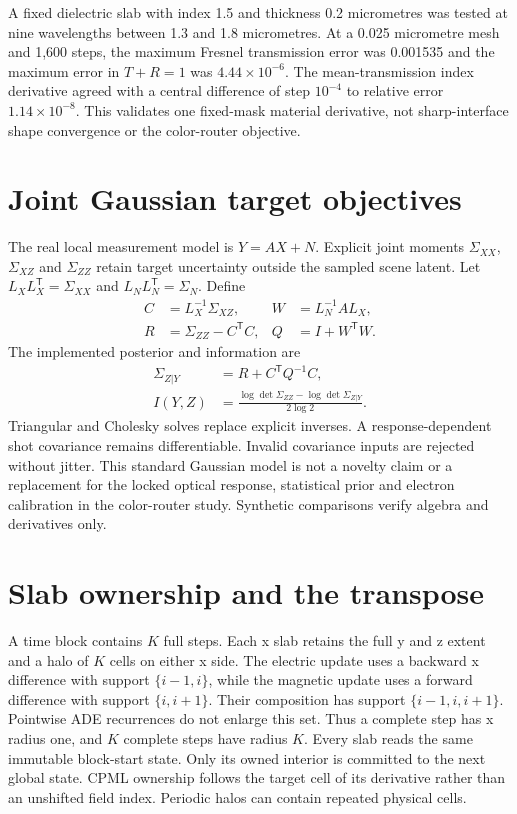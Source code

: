 \documentclass[11pt,a4paper]{article}
\begin{document}
A fixed dielectric slab with index 1.5 and thickness 0.2 micrometres was tested
at nine wavelengths between 1.3 and 1.8 micrometres. At a 0.025 micrometre mesh
and 1,600 steps, the maximum Fresnel transmission error was 0.001535 and the
maximum error in $T+R=1$ was $4.44\times10^{-6}$. The mean-transmission index
derivative agreed with a central difference of step $10^{-4}$ to relative
error $1.14\times10^{-8}$. This validates one fixed-mask material derivative,
not sharp-interface shape convergence or the color-router objective.

\section{Joint Gaussian target objectives}
The real local measurement model is $Y=AX+N$. Explicit joint moments
$\Sigma_{XX}$, $\Sigma_{XZ}$ and $\Sigma_{ZZ}$ retain target uncertainty
outside the sampled scene latent. Let $L_XL_X^{\mathsf T}=\Sigma_{XX}$ and
$L_NL_N^{\mathsf T}=\Sigma_N$. Define
\begin{align}
 C&=L_X^{-1}\Sigma_{XZ},& W&=L_N^{-1}AL_X,\\
 R&=\Sigma_{ZZ}-C^{\mathsf T}C,& Q&=I+W^{\mathsf T}W.
\end{align}
The implemented posterior and information are
\begin{align}
 \Sigma_{Z|Y}&=R+C^{\mathsf T}Q^{-1}C,\\
 I(Y,Z)&=\frac{\log\det\Sigma_{ZZ}-\log\det\Sigma_{Z|Y}}{2\log 2}.
\end{align}
Triangular and Cholesky solves replace explicit inverses. A response-dependent
shot covariance remains differentiable. Invalid covariance inputs are rejected
without jitter. This standard Gaussian model is not a novelty claim or a
replacement for the locked optical response, statistical prior and electron
calibration in the color-router study. Synthetic comparisons verify algebra
and derivatives only.

\section{Slab ownership and the transpose}
A time block contains $K$ full steps. Each x slab retains the full y and z
extent and a halo of $K$ cells on either x side. The electric update uses a
backward x difference with support $\{i-1,i\}$, while the magnetic update
uses a forward difference with support $\{i,i+1\}$. Their composition has
support $\{i-1,i,i+1\}$. Pointwise ADE recurrences do not enlarge this set.
Thus a complete step has x radius one, and $K$ complete steps have radius $K$.
Every slab reads the same immutable
block-start state. Only its owned interior is committed to the next global
state. CPML ownership follows the target cell of its derivative rather than
an unshifted field index. Periodic halos can contain repeated physical cells.
\end{document}
